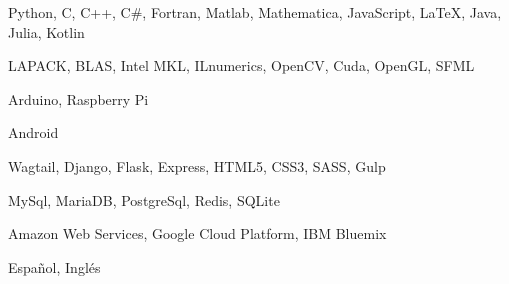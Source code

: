 
\begin{cvskills}

  \cvskill
    {
    } %
    {Python, C, C++, C\#, Fortran, Matlab, Mathematica, JavaScript, LaTeX, Java, Julia, Kotlin} %

  \cvskill
  {
  } %
  {LAPACK, BLAS, Intel MKL, ILnumerics, OpenCV, Cuda, OpenGL, SFML} %

  \cvskill
  {
  } %
  {Arduino, Raspberry Pi} %

  \cvskill
    {
    } %
    {Android} %

  \cvskill
    {
    } %
    {Wagtail, Django, Flask, Express, HTML5, CSS3, SASS, Gulp} %

  \cvskill
    {
    } %
    {MySql, MariaDB, PostgreSql, Redis, SQLite} %

  \cvskill
    {
    } %
    {Amazon Web Services, Google Cloud Platform, IBM Bluemix} %

  \cvskill
  {
  } %
  {Español, Inglés} %

\end{cvskills}
